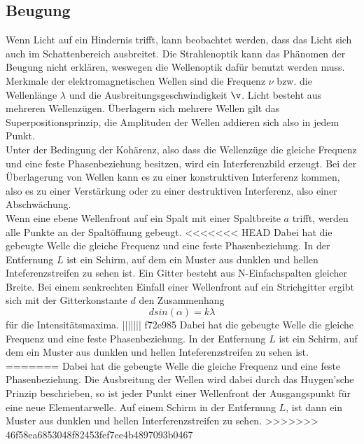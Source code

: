 \subsection{Beugung}
\label{subsec:Beugung}
Wenn Licht auf ein Hindernis trifft, kann beobachtet werden, dass das Licht sich auch im Schattenbereich ausbreitet.
Die Strahlenoptik kann das Phänomen der Beugung nicht erklären, weswegen die Wellenoptik dafür benutzt werden muss.
Merkmale der elektromagnetischen Wellen sind die Frequenz $\nu$ bzw. die Wellenlänge $\lambda$ und die Ausbreitungsgeschwindigkeit $\v$.
Licht besteht aus mehreren Wellenzügen.
Überlagern sich mehrere Wellen gilt das Superpositionsprinzip, die Amplituden der Wellen addieren sich also in jedem Punkt.\\
Unter der Bedingung der Kohärenz, also dass die Wellenzüge die gleiche Frequenz und eine feste Phasenbeziehung besitzen, wird ein Interferenzbild erzeugt.
Bei der Überlagerung von Wellen kann es zu einer konstruktiven Interferenz kommen, also es zu einer  Verstärkung oder zu einer destruktiven
Interferenz, also einer Abschwächung.\\
Wenn eine ebene Wellenfront auf ein Spalt mit einer Spaltbreite $a$ trifft, werden alle Punkte an der Spaltöffnung gebeugt.
<<<<<<< HEAD
Dabei hat die gebeugte Welle die gleiche Frequenz und eine feste Phasenbeziehung. 
In der Entfernung $L$ ist ein Schirm, auf dem ein Muster aus dunklen und hellen Inteferenzstreifen zu sehen ist.
Ein Gitter besteht aus N-Einfachspalten gleicher Breite.
Bei einem senkrechten Einfall einer Wellenfront auf ein Strichgitter ergibt sich mit der Gitterkonstante $d$ den Zusammenhang
\begin{equation}
    d sin(\alpha) = k \lambda
    \label{eqn:Gitter}
\end{equation}
für die Intensitätsmaxima.
||||||| f72e985
Dabei hat die gebeugte Welle die gleiche Frequenz und eine feste Phasenbeziehung. 
In der Entfernung $L$ ist ein Schirm, auf dem ein Muster aus dunklen und hellen Inteferenzstreifen zu sehen ist.
=======
Dabei hat die gebeugte Welle die gleiche Frequenz und eine feste Phasenbeziehung.
Die Ausbreitung der Wellen wird dabei durch das Huygen'sche Prinzip beschrieben, so ist jeder Punkt einer Wellenfront der Ausgangspunkt
für eine neue Elementarwelle.
Auf einem Schirm in der Entfernung $L$, ist dann ein Muster aus dunklen und hellen Interferenzstreifen zu sehen.
>>>>>>> 46f58ea6853048f82453fef7ee4b4897093b0467

